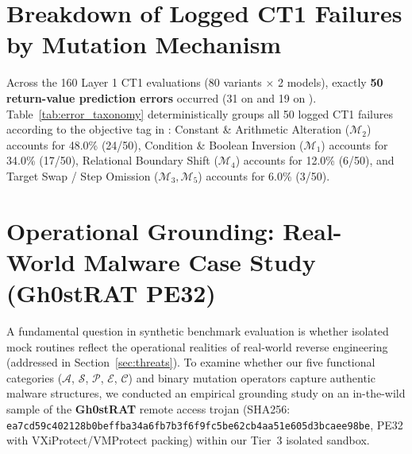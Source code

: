 \documentclass[conference]{IEEEtran}
\begin{document}
\section{Breakdown of Logged CT1 Failures by Mutation Mechanism}
Across the 160 Layer 1 CT1 evaluations (80 variants $\times$ 2 models), exactly \textbf{50 return-value prediction errors} occurred (31 on  and 19 on ). Table~\ref{tab:error_taxonomy} deterministically groups all 50 logged CT1 failures according to the objective  tag in : Constant \& Arithmetic Alteration ($\mathcal{M}_2$) accounts for 48.0\% (24/50), Condition \& Boolean Inversion ($\mathcal{M}_1$) accounts for 34.0\% (17/50), Relational Boundary Shift ($\mathcal{M}_4$) accounts for 12.0\% (6/50), and Target Swap / Step Omission ($\mathcal{M}_3, \mathcal{M}_5$) accounts for 6.0\% (3/50).

\begin{table}[t]
\centering
\caption{Deterministic grouping of all 50 logged CT1 errors by ground-truth mutation operator family in \texttt{results/benchmark\_raw\_logs.json}.}
\label{tab:error_taxonomy}
\end{table}

\section{Operational Grounding: Real-World Malware Case Study (Gh0stRAT PE32)}
\label{sec:case_study}
A fundamental question in synthetic benchmark evaluation is whether isolated mock routines reflect the operational realities of real-world reverse engineering (addressed in Section~\ref{sec:threats}). To examine whether our five functional categories ($\mathcal{A}$, $\mathcal{S}$, $\mathcal{P}$, $\mathcal{E}$, $\mathcal{C}$) and binary mutation operators capture authentic malware structures, we conducted an empirical grounding study on an in-the-wild sample of the \textbf{Gh0stRAT} remote access trojan (SHA256: \texttt{ea7cd59c402128b0beffba34a6fb7b3f6f9fc5be62cb4aa51e605d3bcaee98be}, PE32 with VXiProtect/VMProtect packing) within our Tier~3 isolated sandbox.
\end{document}
